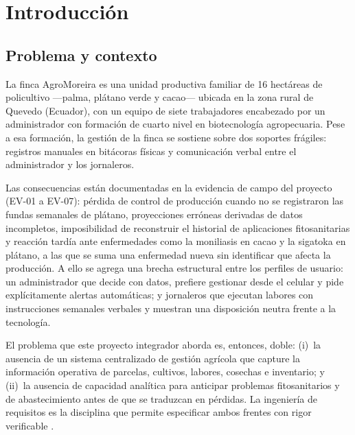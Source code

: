 \section{Introducci\'on}
\label{sec:introduccion}

\subsection{Problema y contexto}

La finca AgroMoreira es una unidad productiva familiar de 16 hect\'areas de policultivo ---palma, pl\'atano verde y cacao--- ubicada en la zona rural de Quevedo (Ecuador), con un equipo de siete trabajadores encabezado por un administrador con formaci\'on de cuarto nivel en biotecnolog\'ia agropecuaria. Pese a esa formaci\'on, la gesti\'on de la finca se sostiene sobre dos soportes fr\'agiles: registros manuales en bit\'acoras f\'isicas y comunicaci\'on verbal entre el administrador y los jornaleros.

Las consecuencias est\'an documentadas en la evidencia de campo del proyecto (EV-01 a EV-07): p\'erdida de control de producci\'on cuando no se registraron las fundas semanales de pl\'atano, proyecciones err\'oneas derivadas de datos incompletos, imposibilidad de reconstruir el historial de aplicaciones fitosanitarias y reacci\'on tard\'ia ante enfermedades como la moniliasis en cacao y la sigatoka en pl\'atano, a las que se suma una enfermedad nueva sin identificar que afecta la producci\'on. A ello se agrega una brecha estructural entre los perfiles de usuario: un administrador que decide con datos, prefiere gestionar desde el celular y pide expl\'icitamente alertas autom\'aticas; y jornaleros que ejecutan labores con instrucciones semanales verbales y muestran una disposici\'on neutra frente a la tecnolog\'ia.

El problema que este proyecto integrador aborda es, entonces, doble: (i)~la ausencia de un sistema centralizado de gesti\'on agr\'icola que capture la informaci\'on operativa de parcelas, cultivos, labores, cosechas e inventario; y (ii)~la ausencia de capacidad analítica para anticipar problemas fitosanitarios y de abastecimiento antes de que se traduzcan en p\'erdidas. La ingenier\'ia de requisitos es la disciplina que permite especificar ambos frentes con rigor verificable \cite{swebok2024}.

